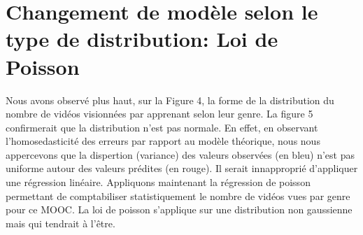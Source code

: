 \documentclass[12pt, a4paper, titlepage, table]{article}
\begin{document}
\section{Changement de modèle selon le type de distribution: Loi de Poisson}
Nous avons observé plus haut, sur la Figure 4, la forme de la distribution du nombre de vidéos visionnées par apprenant 
selon leur genre.
La figure 5 confirmerait que la distribution n'est pas normale. En effet, en observant l'homosedasticité des erreurs par 
rapport au modèle théorique, nous nous appercevons que la dispertion (variance) des valeurs observées (en bleu)
n'est pas uniforme autour des valeurs prédites (en rouge). 
Il serait innapproprié d'appliquer une régression linéaire.
Appliquons maintenant la régression de poisson permettant de comptabiliser statistiquement le nombre de vidéos vues par
genre pour ce MOOC. La loi de poisson s'applique sur une distribution non gaussienne mais qui tendrait à l'être.
\end{document}
